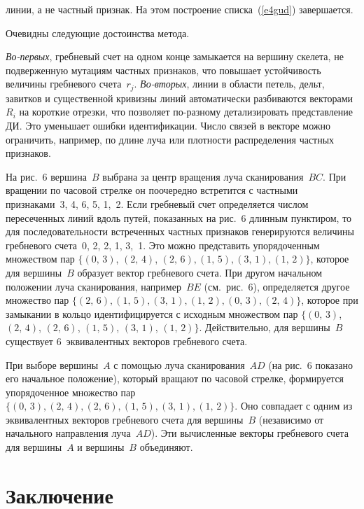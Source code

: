 \begin{multicols}{2}
\addtocounter{figure}{1}

\noindent
линии, а не частный признак. На
этом построение списка~(\ref{e4gud}) завершается.

Очевидны следующие достоинства метода.

\textit{Во-первых}, гребневый счет на одном конце замыкается на вершину скелета, не
подверженную мутациям частных признаков, что повышает устойчивость величины гребневого
счета~$r_j$. \textit{Во-вторых}, линии в области петель, дельт, завитков и существенной
кривизны линий автоматически разбиваются векторами~$R_i$ на короткие отрезки, что
позволяет по-разному детализировать представление ДИ. Это уменьшает ошибки
идентификации. Чис\-ло связей в векторе можно ограничить, например, по длине луча или
плотности распределения частных признаков.

На рис.~6 вершина~$B$ выбрана за центр вращения луча сканирования~$BC$. При
вращении по часовой стрелке он поочередно встретится с частными признаками~3, 4, 6, 5, 1,~2.
Если гребневый счет определяется числом пересеченных линий вдоль путей, показанных на
рис.~6 длинным пунктиром, то для по\-сле\-до\-ва\-тель\-ности встреченных частных
признаков генерируются величины гребневого счета~0, 2, 2, 1, 3,~1. Это можно представить
упорядоченным множеством пар $\{(0,\,3)$, $(2,\,4)$, $(2,\,6), (1,\,5), (3,\,1), (1,\,2)\}$, которое для
вершины~$B$ образует вектор гребневого счета. При другом начальном положении луча
сканирования, например~$BE$ (см.\ рис.~6), определяется другое множество пар $\{(2,\,6),
(1,\,5), (3,\,1), (1,\,2), (0,\,3), (2,\,4)\}$, которое при замыкании в кольцо идентифицируется с
исходным множеством пар $\{(0,\,3)$, $(2,\,4)$, $(2,\,6)$, $(1,\,5)$, $(3,\,1)$, $(1,\,2)\}$. Действительно, для
вершины~$B$ существует 6~эквивалентных векторов гребневого счета.

При выборе вершины~$A$ с помощью луча сканирования~$AD$ (на рис.~6 показано его
начальное положение), который вращают по часовой стрелке, формируется упорядоченное
множество пар $\{(0,\,3), (2,\,4), (2,\,6), (1,\,5), (3,\,1), (1,\,2)\}$. Оно совпадает с одним из
эквивалентных векторов гребневого счета для вершины~$B$ (независимо от начального
направления луча~$AD$). Эти вычисленные векторы гребневого счета для вершины~$A$ и
вершины~$B$ объединяют.

\section{Заключение}


\end{multicols}
